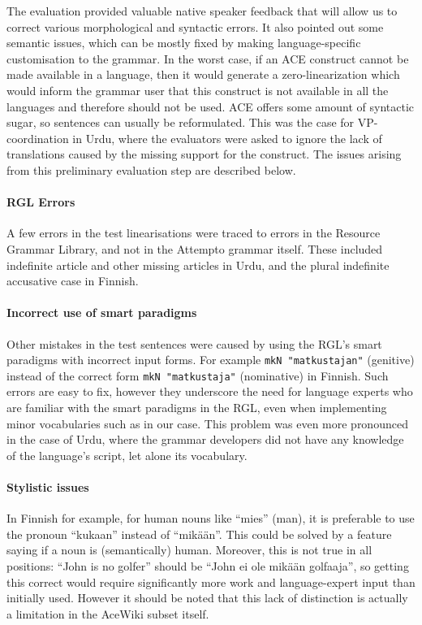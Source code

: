 \documentclass[a4paper]{article}
\begin{document}
The evaluation provided valuable native speaker feedback that will
allow us to correct various morphological and syntactic errors. It
also pointed out some semantic issues, which can be mostly fixed by
making language-specific customisation to the grammar. In the worst
case, if an ACE construct cannot be made available in a language, then
it would generate a zero-linearization which would inform the grammar
user that this construct is not available in all the languages and
therefore should not be used. ACE offers some amount of syntactic
sugar, so sentences can usually be reformulated. This was the case for
VP-coordination in Urdu, where the evaluators were asked to ignore the
lack of translations caused by the missing support for the construct.
The issues arising from this preliminary evaluation step are described
below.

\paragraph{RGL Errors}
A few errors in the test linearisations were traced to errors in the
Resource Grammar Library, and not in the Attempto grammar itself.
These included indefinite article and other missing articles in Urdu,
and the plural indefinite accusative case in Finnish.


\paragraph{Incorrect use of smart paradigms}
Other mistakes in the test sentences were caused by using the RGL's
smart paradigms with incorrect input forms. For example
\verb|mkN "matkustajan"| (genitive) instead of the correct form
\verb|mkN "matkustaja"| (nominative) in Finnish. Such errors are easy to fix,
however they underscore the need for language experts who are familiar
with the smart paradigms in the RGL, even when implementing minor
vocabularies such as in our case. This problem was even more
pronounced in the case of Urdu, where the grammar developers did not
have any knowledge of the language's script, let alone its vocabulary.


\paragraph{Stylistic issues}
In Finnish for example, for human nouns like ``mies'' (man), it is
preferable to use the pronoun ``kukaan'' instead of ``mikään''. This
could be solved by a feature saying if a noun is (semantically)
human. Moreover, this is not true in all positions: ``John is no
golfer'' should be ``John ei ole mikään golfaaja'', so getting this
correct would require significantly more work and language-expert
input than initially used.  However it should be noted that this lack
of distinction is actually a limitation in the AceWiki subset itself.
\end{document}
